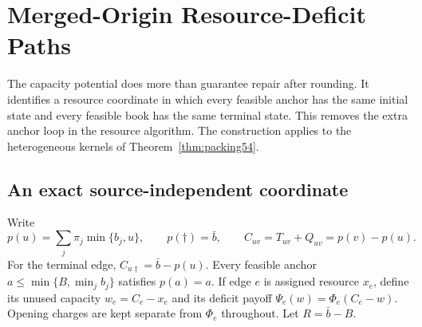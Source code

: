 \section{Merged-Origin Resource-Deficit Paths}\label{sec:deficit56}
The capacity potential does more than guarantee repair after rounding. It identifies a resource coordinate in which every feasible anchor has the same initial state and every feasible book has the same terminal state. This removes the extra anchor loop in the resource algorithm. The construction applies to the heterogeneous kernels of Theorem~\ref{thm:packing54}.

\subsection{An exact source-independent coordinate}
Write
\[
 p(u)=\sum_j\pi_j\min\{b_j,u\},\qquad p(\dagger)=\bar b,
 \qquad C_{uv}=T_{uv}+Q_{uv}=p(v)-p(u).
\]
For the terminal edge, $C_{u\dagger}=\bar b-p(u)$. Every feasible anchor $a\leq\min\{B,\min_jb_j\}$ satisfies $p(a)=a$. If edge $e$ is assigned resource $x_e$, define its unused capacity $w_e=C_e-x_e$ and its deficit payoff $\Psi_e(w)=\Phi_e(C_e-w)$. Opening charges are kept separate from $\Phi_e$ throughout. Let $R=\bar b-B$.

